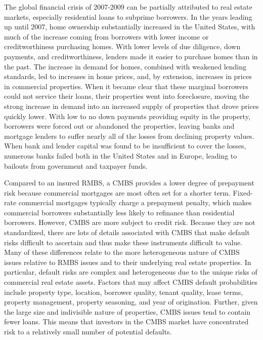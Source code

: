 \documentclass[11pt]{article}
\begin{document}
The global financial crisis of 2007-2009 can be partially attributed to real estate markets, especially residential loans to subprime borrowers. In the years leading up until 2007, home ownership substantially increased in the United States, with much of the increase coming from borrowers with lower income or creditworthiness purchasing homes. With lower levels of due diligence, down payments, and creditworthiness, lenders made it easier to purchase homes than in the past. The increase in demand for homes, combined with weakened lending standards, led to increases in home prices, and, by extension, increases in prices in commercial properties. When it became clear that these marginal borrowers could not service their loans, their properties went into foreclosure, moving the strong increase in demand into an increased supply of properties that drove prices quickly lower. With low to no down payments providing equity in the property, borrowers were forced out or abandoned the properties, leaving banks and mortgage lenders to suffer nearly all of the losses from declining property values. When bank and lender capital was found to be insufficient to cover the losses, numerous banks failed both in the United States and in Europe, leading to bailouts from government and taxpayer funds.

Compared to an insured RMBS, a CMBS provides a lower degree of prepayment risk because commercial mortgages are most often set for a shorter term. Fixed-rate commercial mortgages typically charge a prepayment penalty, which makes commercial borrowers substantially less likely to refinance than residential borrowers. However, CMBS are more subject to credit risk. Because they are not standardized, there are lots of details associated with CMBS that make default risks difficult to ascertain and thus make these instruments difficult to value. Many of these differences relate to the more heterogeneous nature of CMBS issues relative to RMBS issues and to their underlying real estate properties. In particular, default risks are complex and heterogeneous due to the unique risks of commercial real estate assets. Factors that may affect CMBS default probabilities include property type, location, borrower quality, tenant quality, lease terms, property management, property seasoning, and year of origination. Further, given the large size and indivisible nature of properties, CMBS issues tend to contain fewer loans. This means that investors in the CMBS market have concentrated risk to a relatively small number of potential defaults.
\end{document}
